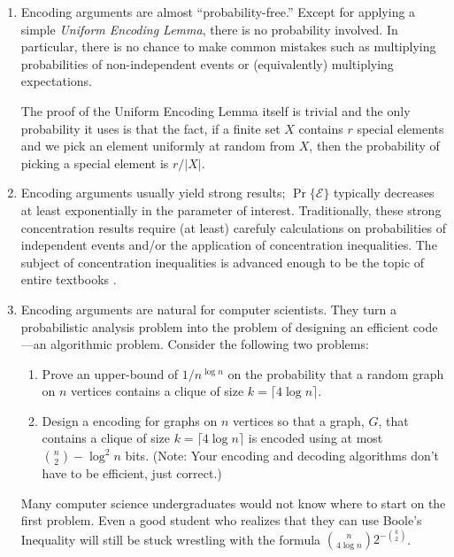 \documentclass{patmorin}
\begin{document}
\begin{enumerate}
  \item Encoding arguments are almost ``probability-free.''  Except for
  applying a simple \emph{Uniform Encoding Lemma}, there is no probability
  involved.  In particular, there is no chance to make common mistakes
  such as multiplying probabilities of non-independent events or
  (equivalently) multiplying expectations.

  The proof of the Uniform Encoding Lemma itself is trivial and the only
  probability it uses is that the fact, if a finite set $X$ contains $r$
  special elements and we pick an element uniformly at random from $X$,
  then the probability of picking a special element is $r/|X|$.

  \item Encoding arguments usually yield strong results;
  $\Pr\{\mathcal{E}\}$ typically decreases at least exponentially in
  the parameter of interest. Traditionally, these strong concentration
  results require (at least) carefuly calculations on probabilities of
  independent events and/or the application of concentration inequalities.
  The subject of concentration inequalities is advanced enough to be
  the topic of entire textbooks \cite{boucheron.lugosi.ea:concentration,dubhashi.panconesi:concentration}.
  
  \item Encoding arguments are natural for computer scientists. They
  turn a probabilistic analysis problem into the problem of designing an
  efficient code---an algorithmic problem. Consider the following 
  two problems:
    \begin{enumerate}

    \item Prove an upper-bound of $1/n^{\log n}$ on the probability that
       a random graph on $n$ vertices contains a clique of size $k=\lceil
       4\log n\rceil$.

    \item Design a encoding for graphs on $n$ vertices so that a graph,
       $G$, that contains a clique of size $k=\lceil 4\log n\rceil$
       is encoded using at most $\binom{n}{2}-\log^2 n$ bits. (Note:
       Your encoding and decoding algorithms don't have to be efficient,
       just correct.)
    \end{enumerate}
  Many computer science undergraduates would not know where to start
  on the first problem.  Even a good student who realizes that
  they can use Boole's Inequality will still be stuck
  wrestling with the formula $\binom{n}{4\log n}2^{-\binom{k}{2}}$.  
\end{enumerate}
\end{document}

